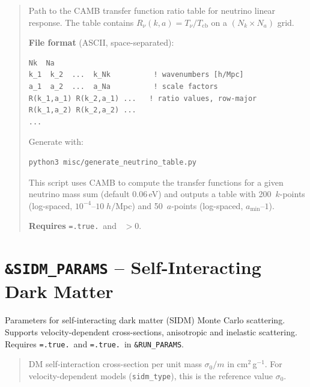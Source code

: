 \label{param:neutrino_table}

\begin{quote}
Path to the CAMB transfer function ratio table for neutrino linear
response.  The table contains $R_\nu(k, a) = T_\nu / T_{\mathrm{cb}}$
on a $(N_k \times N_a)$ grid.

\textbf{File format} (ASCII, space-separated):
\begin{verbatim}
Nk  Na
k_1  k_2  ...  k_Nk          ! wavenumbers [h/Mpc]
a_1  a_2  ...  a_Na          ! scale factors
R(k_1,a_1) R(k_2,a_1) ...   ! ratio values, row-major
R(k_1,a_2) R(k_2,a_2) ...
...
\end{verbatim}

Generate with:
\begin{verbatim}
python3 misc/generate_neutrino_table.py
\end{verbatim}
This script uses CAMB to compute the transfer functions for a given
neutrino mass sum (default $0.06\,$eV) and outputs a table with
200~$k$-points (log-spaced, $10^{-4}$--$10\;h/$Mpc) and 50~$a$-points
(log-spaced, $a_{\min}$--$1$).

\textbf{Requires} \texttt{=.true.}\ and
~$> 0$.
\end{quote}


\section{\texttt{\&SIDM\_PARAMS} -- Self-Interacting Dark Matter}
\label{sec:sidm_params}

Parameters for self-interacting dark matter (SIDM) Monte Carlo
scattering.  Supports velocity-dependent cross-sections, anisotropic
and inelastic scattering.
Requires \texttt{=.true.}\ and
\texttt{=.true.}\ in \texttt{\&RUN\_PARAMS}.

\label{param:sidm_cross_section}

\begin{quote}
DM self-interaction cross-section per unit mass $\sigma_0/m$ in
cm$^2$\,g$^{-1}$.  For velocity-dependent models (\texttt{sidm\_type}),
this is the reference value $\sigma_0$.
\end{quote}

